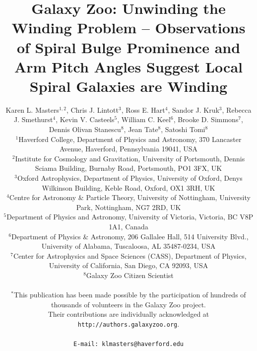 \documentclass[usenatbib]{mn2e}
\newcommand{\etal}{{\it et al.}}
\begin{document}
\title[Galaxy Zoo: Unwinding the Winding Problem]{Galaxy Zoo: Unwinding the Winding Problem -- Observations of Spiral Bulge Prominence and Arm Pitch Angles Suggest Local Spiral Galaxies are Winding}
\author[K.L. Masters \etal]{Karen L. Masters$^{1,2}$, Chris J. Lintott$^{3}$, Ross E. Hart$^{4}$, Sandor J. Kruk$^{3}$, \newauthor Rebecca J. Smethurst$^{4}$,  Kevin V. Casteels$^5$, William C. Keel$^6$, Brooke D. Simmons$^7$, \newauthor Dennis Olivan Stanescu$^8$, Jean Tate$^8$, Satoshi Tomi$^8$\\ %
$^1$Haverford College, Department of Physics and Astronomy, 370 Lancaster Avenue, Haverford, Pennsylvania 19041, USA\\
$^2$Institute for Cosmology and Gravitation, University of Portsmouth, Dennis Sciama Building, Burnaby Road, Portsmouth, PO1 3FX, UK \\
 $^{3}$Oxford Astrophysics, Department of Physics, University of Oxford, Denys Wilkinson Building, Keble Road, Oxford, OX1 3RH, UK\\
 $^4$Centre for Astronomy \& Particle Theory, University of Nottingham, University Park, Nottingham, NG7 2RD, UK\\
 $^5$Department of Physics and Astronomy, University of Victoria, Victoria, BC V8P 1A1, Canada\\
 $^6$Department of Physics \& Astronomy, 206 Gallalee Hall, 514 University Blvd., University of Alabama, Tuscaloosa, AL 35487-0234, USA\\
 $^7$Center for Astrophysics and Space Sciences (CASS), Department of Physics, University of California, San Diego, CA 92093, USA\\
 $^8$Galaxy Zoo Citizen Scientist\\
\\
 $^*$This publication has been made possible by the participation of hundreds of thousands of volunteers in the Galaxy Zoo project. \\ Their contributions are individually acknowledged at \texttt{http://authors.galaxyzoo.org}. \\
\\
{\tt E-mail: klmasters@haverford.edu}
 }

 
\end{document}
